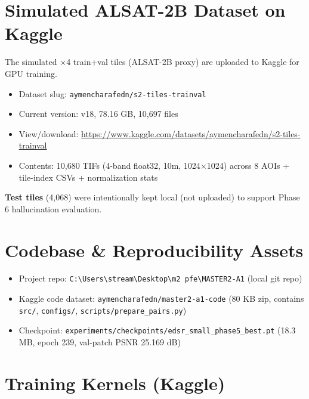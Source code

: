 \section{Simulated ALSAT-2B Dataset on Kaggle}

The simulated $\times$4 train+val tiles (ALSAT-2B proxy) are uploaded to Kaggle for GPU training.

\begin{itemize}
    \item Dataset slug: \texttt{aymencharafedn/s2-tiles-trainval}
    \item Current version: v18, 78.16 GB, 10,697 files
    \item View/download: \url{https://www.kaggle.com/datasets/aymencharafedn/s2-tiles-trainval}
    \item Contents: 10,680 TIFs (4-band float32, 10m, 1024$\times$1024) across 8 AOIs + tile-index CSVs + normalization stats
\end{itemize}

\textbf{Test tiles} (4,068) were intentionally kept local (not uploaded) to support Phase 6 hallucination evaluation.

\section{Codebase \& Reproducibility Assets}

\begin{itemize}
    \item Project repo: \texttt{C:\textbackslash Users\textbackslash stream\textbackslash Desktop\textbackslash m2 pfe\textbackslash MASTER2-A1} (local git repo)
    \item Kaggle code dataset: \texttt{aymencharafedn/master2-a1-code} (80 KB zip, contains \texttt{src/}, \texttt{configs/}, \texttt{scripts/prepare\_pairs.py})
    \item Checkpoint: \texttt{experiments/checkpoints/edsr\_small\_phase5\_best.pt} (18.3 MB, epoch 239, val-patch PSNR 25.169 dB)
\end{itemize}

\section{Training Kernels (Kaggle)}

